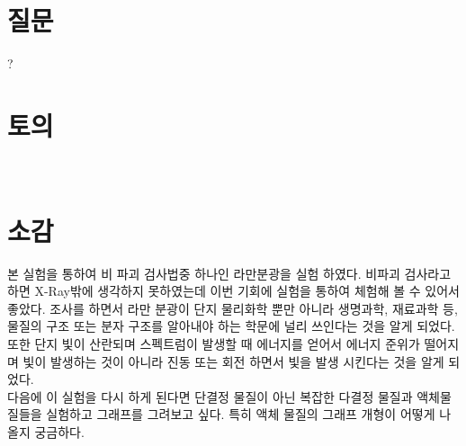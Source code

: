 \documentclass{report}
\begin{document}
\newpage
\section{질문}
?

\section{토의}


\ \\
\section{소감}
본 실험을 통하여 비 파괴 검사법중 하나인 라만분광을 실험 하였다. 비파괴 검사라고 하면 X-Ray밖에 생각하지 못하였는데 이번 기회에 실험을 통하여 체험해 볼 수 있어서 좋았다. 조사를 하면서 라만 분광이 단지 물리화학 뿐만 아니라 생명과학, 재료과학 등, 물질의 구조 또는 분자 구조를 알아내야 하는 학문에 널리 쓰인다는 것을 알게 되었다. 또한 단지 빛이 산란되며 스펙트럼이 발생할 때 에너지를 얻어서 에너지 준위가 떨어지며 빛이 발생하는 것이 아니라 진동 또는 회전 하면서 빛을 발생 시킨다는 것을 알게 되었다.\\
다음에 이 실험을 다시 하게 된다면 단결정 물질이 아닌 복잡한 다결정 물질과 액체물질들을 실험하고 그래프를 그려보고 싶다. 특히 액체 물질의 그래프 개형이 어떻게 나올지 궁금하다.
\renewcommand{\bibname}{참고문헌}



\end{document}
